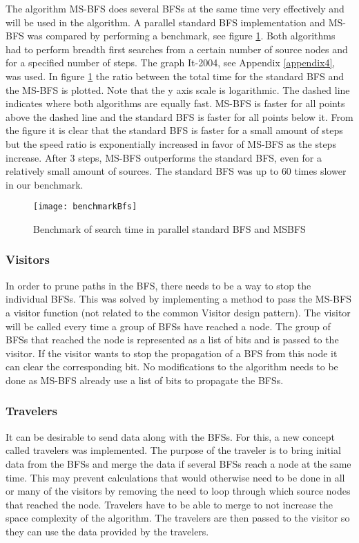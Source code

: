 The algorithm MS-BFS \cite{msbfs} does several BFSs at the same time very effectively and will be used in the algorithm. A parallel standard BFS implementation and MS-BFS was compared by performing a benchmark, see figure \ref{fig:benchmarkbfs}. Both algorithms had to perform breadth first searches from a certain number of source nodes and for a specified number of steps. The graph It-2004, see Appendix \ref{appendix4}, was used. In figure \ref{fig:benchmarkbfs} the ratio between the total time for the standard BFS and the MS-BFS is plotted. Note that the y axis scale is logarithmic. The dashed line indicates where both algorithms are equally fast. MS-BFS is faster for all points above the dashed line and the standard BFS is faster for all points below it. From the figure it is clear that the standard BFS is faster for a small amount of steps but the speed ratio is exponentially increased in favor of MS-BFS as the steps increase. After $3$ steps, MS-BFS outperforms the standard BFS, even for a relatively small amount of sources. The standard BFS was up to $60$ times slower in our benchmark.
\begin{figure}[h]
\centering
\texttt{[image: benchmarkBfs]}    
\captionsetup{justification=centering}
\caption {Benchmark of search time in parallel standard BFS and MSBFS}
\label{fig:benchmarkbfs}
\end{figure}

\subsubsection{Visitors}
In order to prune paths in the BFS, there needs to be a way to stop the individual BFSs. This was solved by implementing a method to pass the MS-BFS a visitor function (not related to the common Visitor design pattern). The visitor will be called every time a group of BFSs have reached a node. The group of BFSs that reached the node is represented as a list of bits and is passed to the visitor. If the visitor wants to stop the propagation of a BFS from this node it can clear the corresponding bit. No modifications to the algorithm needs to be done as MS-BFS already use a list of bits to propagate the BFSs.

\subsubsection{Travelers}
It can be desirable to send data along with the BFSs. For this, a new concept called travelers was implemented. The purpose of the traveler is to bring initial data from the BFSs and merge the data if several BFSs reach a node at the same time. This may prevent calculations that would otherwise need to be done in all or many of the visitors by removing the need to loop through which source nodes that reached the node. Travelers have to be able to merge to not increase the space complexity of the algorithm. The travelers are then passed to the visitor so they can use the data provided by the travelers. 

